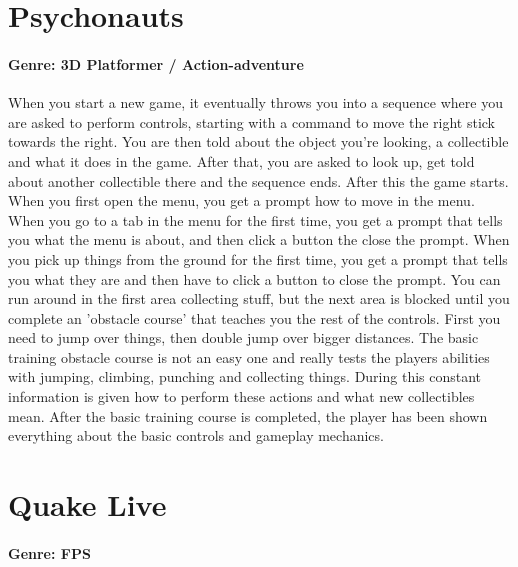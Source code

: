 \section{Psychonauts}
\paragraph{Genre: 3D Platformer / Action-adventure}

When you start a new game, it eventually throws you into a sequence where you are asked to perform controls, starting with a command to move the right stick towards the right. You are then told about the object you're looking, a collectible and what it does in the game. After that, you are asked to look up, get told about another collectible there and the sequence ends. After this the game starts.
When you first open the menu, you get a prompt how to move in the menu.
When you go to a tab in the menu for the first time, you get a prompt that tells you what the menu is about, and then click a button the close the prompt.
When you pick up things from the ground for the first time, you get a prompt that tells you what they are and then have to click a button to close the prompt.
You can run around in the first area collecting stuff, but the next area is blocked until you complete an 'obstacle course' that teaches you the rest of the controls.
First you need to jump over things, then double jump over bigger distances.
The basic training obstacle course is not an easy one and really tests the players abilities with jumping, climbing, punching and collecting things. During this constant information is given how to perform these actions and what new collectibles mean.
After the basic training course is completed, the player has been shown everything about the basic controls and gameplay mechanics.

\section{Quake Live}
\paragraph{Genre: FPS}

